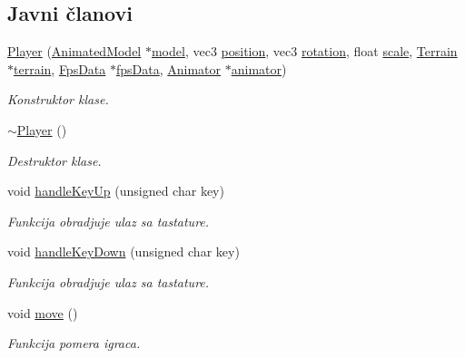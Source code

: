 \subsection*{Javni članovi}
\begin{DoxyCompactItemize}
\item 
\hyperlink{classentity_1_1Player_ab96231144acc882d898ec60abd7ed702}{Player} (\hyperlink{classmodel_1_1AnimatedModel}{Animated\+Model} $\ast$\hyperlink{classentity_1_1AnimatedEntity_a1f9e73e14bf1588ed9e7c9e7f7d4aab3}{model}, vec3 \hyperlink{classentity_1_1AnimatedEntity_ab02891959f4c1191807e267c48466230}{position}, vec3 \hyperlink{classentity_1_1AnimatedEntity_a32f7718856950b74d40f4a96c1aa6f3d}{rotation}, float \hyperlink{classentity_1_1AnimatedEntity_a137e8fe0398142e9dedebb3eb1fe4f2f}{scale}, \hyperlink{classterrain_1_1Terrain}{Terrain} $\ast$\hyperlink{classentity_1_1Player_adc298ca7a3d8ab3528440489ed4ea60e}{terrain}, \hyperlink{classutility_1_1FpsData}{Fps\+Data} $\ast$\hyperlink{classentity_1_1Player_a830db86853301f3619dd4416c52229e4}{fps\+Data}, \hyperlink{classanimation_1_1Animator}{Animator} $\ast$\hyperlink{classentity_1_1Player_a77d9fff91395b091561f81b9acd5f034}{animator})
\begin{DoxyCompactList}\small\item\em Konstruktor klase. \end{DoxyCompactList}\item 
\hyperlink{classentity_1_1Player_aba0d4255d0d8624d01067418279bc9a1}{$\sim$\+Player} ()
\begin{DoxyCompactList}\small\item\em Destruktor klase. \end{DoxyCompactList}\item 
void \hyperlink{classentity_1_1Player_a27a2007873610439598c0ac07a91f3ac}{handle\+Key\+Up} (unsigned char key)
\begin{DoxyCompactList}\small\item\em Funkcija obradjuje ulaz sa tastature. \end{DoxyCompactList}\item 
void \hyperlink{classentity_1_1Player_af3d0b548d6daeb37d03f9fa57fb28f8a}{handle\+Key\+Down} (unsigned char key)
\begin{DoxyCompactList}\small\item\em Funkcija obradjuje ulaz sa tastature. \end{DoxyCompactList}\item 
void \hyperlink{classentity_1_1Player_a9b0a7ab96a4ba7c24c7ddac8f07c4d5e}{move} ()
\begin{DoxyCompactList}\small\item\em Funkcija pomera igraca. \end{DoxyCompactList}\end{DoxyCompactItemize}
